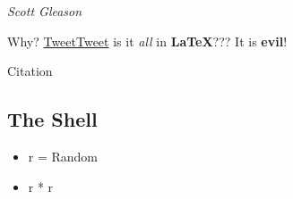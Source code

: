 \textit{Scott Gleason} 

Why? \href{twitter.com}{TweetTweet} is it \textit{all} in \textbf{LaTeX}??? It is \textbf{evil}!

Citation\cite{Ferry_2006}


\subsection{The Shell}
\begin{itemize}
\item r = Random
\item r * r
\end{itemize}